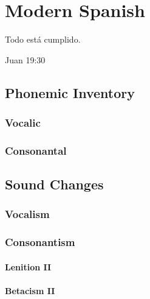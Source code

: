 \documentclass{report}[12pt]
\begin{document}
\thispagestyle{empty}

\pagebreak

\chapter{Modern Spanish}

\epigraph{Todo está cumplido.}{Juan 19:30}

\section{Phonemic Inventory}

\subsection{Vocalic}

\subsection{Consonantal}

\section{Sound Changes}

\subsection{Vocalism}

\subsection{Consonantism}

\subsubsection*{Lenition II}\label{sec:lenition_2}

\begin{tcolorbox}

\end{tcolorbox}

\subsubsection*{Betacism II}\label{sec:betacism_2}

\begin{tcolorbox}

\end{tcolorbox}
\end{document}
